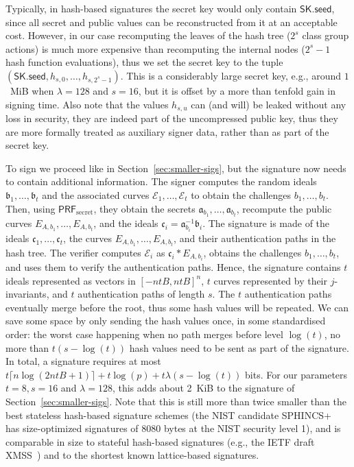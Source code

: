 \documentclass{llncs}
\newcommand{\E}{\mathcal{E}}
\newcommand{\seed}{\mathsf{seed}}
\newcommand{\SK}{\mathsf{SK}}
\renewcommand{\a}{\mathfrak{a}}
\renewcommand{\b}{\mathfrak{b}}
\renewcommand{\c}{\mathfrak{c}}
\newcommand{\PRF}{\mathsf{PRF}}
\newcommand{\PRFs}{\PRF_{\mathrm{secret}}}
\begin{document}
Typically, in hash-based signatures the secret key would only contain $\SK.\seed$, since all secret and public values can be reconstructed from it at an acceptable cost.
However, in our case recomputing the leaves of the hash tree ($2^s$ class group actions) is much more expensive than recomputing the internal nodes ($2^s-1$ hash function evaluations), thus we set the secret key to the tuple $(\SK.\seed,h_{s,0},\dots,h_{s,2^s-1})$.
This is a considerably large secret key, e.g., around $1$~MiB when $\lambda=128$ and $s=16$, but it is offset by a more than tenfold gain in signing time.
Also note that the values $h_{s,u}$ can (and will) be leaked without any loss in security, they are indeed part of the uncompressed public key, thus they are more formally treated as auxiliary signer data, rather than as part of the secret key.

To sign we proceed like in Section~\ref{sec:smaller-sigs}, but the signature now needs to contain additional information.
The signer computes the random ideals $\b_1,\dots,\b_t$ and the associated curves $\E_1,\dots,\E_t$ to obtain the challenges $b_1,\dots,b_t$.
Then, using $\PRFs$, they obtain the secrets $\a_{b_1},\dots,\a_{b_t}$, recompute the public curves $E_{A,b_1},\dots,E_{A,b_t}$, and the ideals $\c_i=\a_{b_i}^{-1}\b_i$.
The signature is made of the ideals $\c_1,\dots,\c_t$, the curves $E_{A,b_1},\dots,E_{A,b_t}$, and their authentication paths in the hash tree.
The verifier computes $\E_i$ as $\c_i * E_{A,b_i}$, obtains the challenges $b_1,\dots,b_t$, and uses them to verify the authentication paths.
Hence, the signature contains $t$ ideals represented as vectors in $[-ntB,ntB]^n$, $t$ curves represented by their $j$-invariants, and $t$ authentication paths of length $s$.
The $t$ authentication paths eventually merge before the root, thus some hash values will be repeated.
We can save some space by only sending the hash values once, in some standardised order: the worst case happening when no path merges before level $\log(t)$, no more than $t(s-\log(t))$ hash values need to be sent as part of the signature.
In total, a signature requires at most $t\lceil n \log(2ntB+1)\rceil + t\log(p) + t\lambda(s-\log(t))$ bits.
For our parameters $t=8, s=16$ and $\lambda=128$, this adds about 2~KiB to the signature of Section~\ref{sec:smaller-sigs}.
Note that this is still more than twice smaller than the best stateless hash-based signature schemes (the NIST candidate SPHINCS+~\cite{BHHLNPSSWO15,sphincs+} has size-optimized signatures of 8080 bytes at the NIST security level 1), and is comparable in size to stateful hash-based signatures (e.g., the IETF draft XMSS~\cite[\S~5.3.1]{rfc8391}) and to the shortest known lattice-based signatures.
\end{document}
